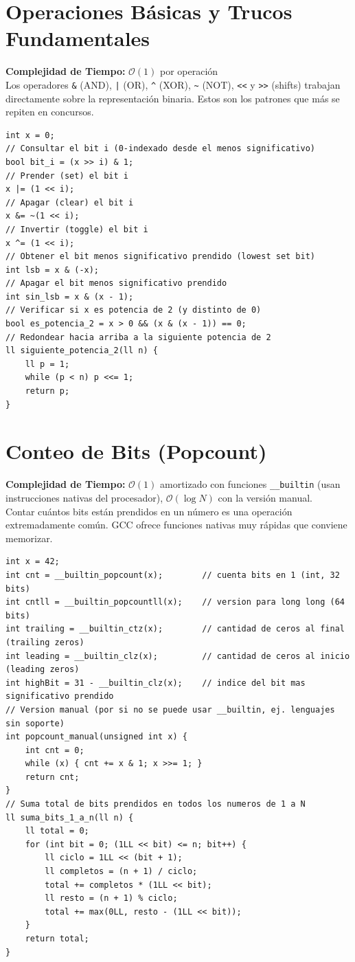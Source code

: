 \documentclass[10pt,twocolumn,letterpaper]{report}
\begin{document}
\section{Operaciones Básicas y Trucos Fundamentales}
\textbf{Complejidad de Tiempo:} $\mathcal{O}(1)$ por operación \\
Los operadores \texttt{\&} (AND), \texttt{|} (OR), \texttt{\^} (XOR), \texttt{\textasciitilde} (NOT), \texttt{<<} y \texttt{>>} (shifts) trabajan directamente sobre la representación binaria. Estos son los patrones que más se repiten en concursos.
\begin{lstlisting}
int x = 0;
// Consultar el bit i (0-indexado desde el menos significativo)
bool bit_i = (x >> i) & 1;
// Prender (set) el bit i
x |= (1 << i);
// Apagar (clear) el bit i
x &= ~(1 << i);
// Invertir (toggle) el bit i
x ^= (1 << i);
// Obtener el bit menos significativo prendido (lowest set bit)
int lsb = x & (-x);
// Apagar el bit menos significativo prendido
int sin_lsb = x & (x - 1);
// Verificar si x es potencia de 2 (y distinto de 0)
bool es_potencia_2 = x > 0 && (x & (x - 1)) == 0;
// Redondear hacia arriba a la siguiente potencia de 2
ll siguiente_potencia_2(ll n) {
    ll p = 1;
    while (p < n) p <<= 1;
    return p;
}
\end{lstlisting}
\section{Conteo de Bits (Popcount)}
\textbf{Complejidad de Tiempo:} $\mathcal{O}(1)$ amortizado con funciones \texttt{\_\_builtin} (usan instrucciones nativas del procesador), $\mathcal{O}(\log N)$ con la versión manual. \\
Contar cuántos bits están prendidos en un número es una operación extremadamente común. GCC ofrece funciones nativas muy rápidas que conviene memorizar.
\begin{lstlisting}
int x = 42;
int cnt = __builtin_popcount(x);        // cuenta bits en 1 (int, 32 bits)
int cntll = __builtin_popcountll(x);    // version para long long (64 bits)
int trailing = __builtin_ctz(x);        // cantidad de ceros al final (trailing zeros)
int leading = __builtin_clz(x);         // cantidad de ceros al inicio (leading zeros)
int highBit = 31 - __builtin_clz(x);    // indice del bit mas significativo prendido
// Version manual (por si no se puede usar __builtin, ej. lenguajes sin soporte)
int popcount_manual(unsigned int x) {
    int cnt = 0;
    while (x) { cnt += x & 1; x >>= 1; }
    return cnt;
}
// Suma total de bits prendidos en todos los numeros de 1 a N
ll suma_bits_1_a_n(ll n) {
    ll total = 0;
    for (int bit = 0; (1LL << bit) <= n; bit++) {
        ll ciclo = 1LL << (bit + 1);
        ll completos = (n + 1) / ciclo;
        total += completos * (1LL << bit);
        ll resto = (n + 1) % ciclo;
        total += max(0LL, resto - (1LL << bit));
    }
    return total;
}
\end{lstlisting}
\end{document}

